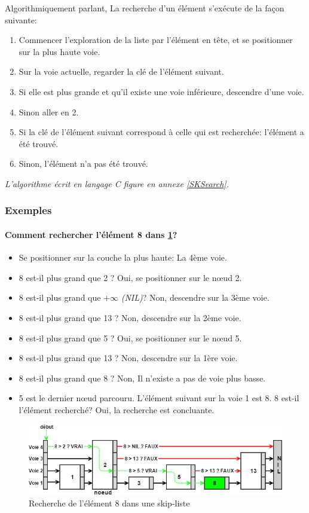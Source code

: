 \documentclass[hidelinks,a4paper, 12pt]{article}
\begin{document}
	Algorithmiquement parlant, La recherche d'un élément s'exécute de la façon suivante:
	\begin{enumerate}
		\item Commencer l'exploration de la liste par l'élément en tête, et se positionner sur la plus haute voie.
		\item Sur la voie actuelle, regarder la clé de l'élément suivant.
		\item Si elle est plus grande et qu'il existe une voie inférieure, descendre d'une voie.
		\item Sinon aller en 2.
		\item Si la clé de l'élément suivant correspond à celle qui est recherchée: l'élément a été trouvé.
		\item Sinon, l'élément n'a pas été trouvé.
	\end{enumerate}
	
	\emph{L'algorithme écrit en langage C figure en annexe \ref{SKSearch}.}
	
	\subsubsection{Exemples}	
	\paragraph*{Comment rechercher l'élément 8 dans \cref{SkipSearch1}?}
	\begin{itemize}
		\item Se positionner sur la couche la plus haute: La 4ème voie.
		\item 8 est-il plus grand que 2 ? Oui, se positionner sur le nœud 2.
		\item 8 est-il plus grand que $+\infty$ \textit{(NIL)}? Non, descendre sur la 3ème voie.
		\item 8 est-il plus grand que 13  ? Non, descendre sur la 2ème voie.
		\item 8 est-il plus grand que 5 ? Oui, se positionner sur le nœud 5.
		\item 8 est-il plus grand que 13 ? Non, descendre sur la 1ère voie.
		\item 8 est-il plus grand que 8 ? Non, Il n'existe a pas de voie plus basse.
		\item 5 est le dernier nœud parcouru. L'élément suivant sur la voie 1 est 8. 8 est-il l'élément recherché? Oui, la recherche est concluante.
	\end{itemize}
	\begin{figure}[h]
		\includegraphics[width=\textwidth]{img/search}
		\caption{Recherche de l'élément 8 dans une skip-liste}
		\label{SkipSearch1}
	\end{figure}
	
\end{document}
